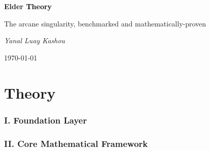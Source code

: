 \documentclass[11pt,twoside]{book}
\begin{document}
\frontmatter

\begin{titlepage}
    \centering
    \vspace*{2cm}
    {\Huge\bfseries \textcolor{DarkSkyBlue}{Elder }\textrm{\textcolor{black}{Theory}}\par}
    \vspace{2cm}
    {\Large The arcane singularity, benchmarked and mathematically-proven\par}
    \vspace{4cm}
    {\Large\itshape Yanal Luay Kashou\par}
    \vfill
    {\large \today\par}
\end{titlepage}

\tableofcontents

\mainmatter









\part{Theory}

\section*{I. Foundation Layer}

\section*{II. Core Mathematical Framework}
\end{document}
